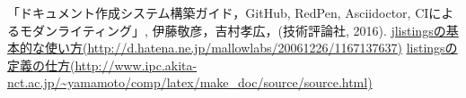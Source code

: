\begin{thebibliography}{99}
  「ドキュメント作成システム構築ガイド，GitHub, RedPen, Asciidoctor, CIによるモダンライティング」, 伊藤敬彦，吉村孝広，(技術評論社, 2016).
  \url{jlistingsの基本的な使い方(http://d.hatena.ne.jp/mallowlabs/20061226/1167137637)}
  \url{listingsの定義の仕方(http://www.ipc.akita-nct.ac.jp/~yamamoto/comp/latex/make_doc/source/source.html)}
\end{thebibliography}
